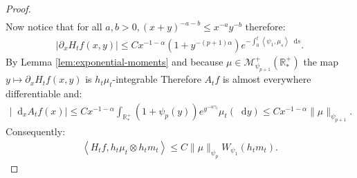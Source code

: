 \documentclass[11pt,a4paper]{article}
\newcommand{\RRP}{\mathbb{R}^+_*}
\newcommand{\MC}{\mathcal{M}}
\newcommand{\brac}[1]{\left\langle#1\right\rangle}
\newcommand{\dd}{\mathop{}\!\mathrm{d}}
\begin{document}
\begin{proof}
\begin{multline*}
    \end{multline*}
    Now notice that for all $a,b > 0, (x+y)^{-a - b} \leq x^{-a}y^{-b}$ therefore:
    \begin{align*}
        \left|\partial_x H_tf(x,y) \right| \leq C x^{-1-\alpha} (1 + y^{-(p+1)\alpha})e^{-\int_0^t \brac{\psi_1,\mu_s}\dd s}.
    \end{align*}
    By Lemma \ref{lem:exponential-moments} and because $\mu \in \MC^+_{\psi_{p+1}}(\RRP)$ the map $y \mapsto \partial_x H_tf(x,y)$ is $h_t \mu_t$-integrable Therefore $A_tf$ is almost everywhere differentiable and: 
    \begin{align*}
        \left|\dd_x A_tf(x) \right| \leq  C x^{-1-\alpha}\int_{\RRP} (1 + \psi_{p}(y)) e^{y^{-\alpha \gamma_t }}\mu_t(\dd y) \leq C x^{-1-\alpha}\| \mu\|_{\psi_{p+1}}.
    \end{align*}
    Consequently:
    \begin{align*}
        \brac{H_tf,h_t\mu_t \otimes h_t m_t} \leq C\|\mu\|_{\psi_{p}} W_{\psi_1}(h_tm_t).
    \end{align*} 


\end{proof}
\end{document}
